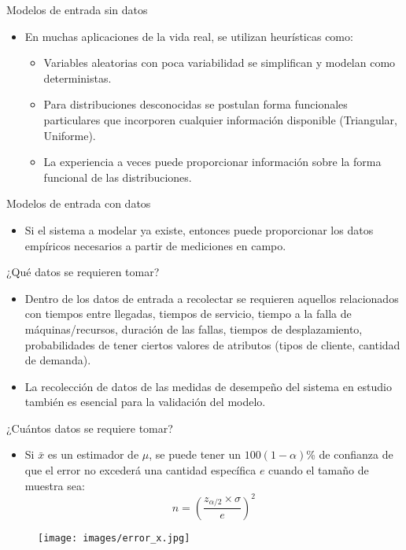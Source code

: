\begin{frame}{Modelos de entrada sin datos}
    \begin{itemize}
        \item En muchas aplicaciones de la vida real, se utilizan heurísticas como:
    \begin{itemize}
        \item Variables aleatorias con poca variabilidad se simplifican y modelan como deterministas.
        \item Para distribuciones desconocidas se postulan forma funcionales particulares que incorporen cualquier información disponible (Triangular, Uniforme). 
        \item La experiencia a veces puede proporcionar información sobre la forma funcional de las distribuciones.
    \end{itemize}
    \end{itemize}
\end{frame}

\begin{frame}{Modelos de entrada con datos}
    \begin{itemize}
    \item Si el sistema a modelar ya existe, entonces puede proporcionar los datos empíricos necesarios a partir de mediciones en campo.
    \end{itemize}
\end{frame}

\begin{frame}{¿Qué datos se requieren tomar?}
    \begin{itemize}
        \item Dentro de los datos de entrada a recolectar se requieren aquellos relacionados con tiempos entre llegadas, tiempos de servicio, tiempo a la falla de máquinas/recursos, duración de las fallas, tiempos de desplazamiento, probabilidades de tener ciertos valores de atributos (tipos de cliente, cantidad de demanda).
        \item La recolección de datos de las medidas de desempeño del sistema en estudio también es esencial para la validación del modelo.
    \end{itemize}
\end{frame}

\begin{frame}{¿Cuántos datos se requiere tomar?}
    \begin{itemize}
        \item Si $\bar{x}$ es un estimador de $\mu$, se puede tener un $100\left(1-\alpha\right)$\% de confianza de que el error no excederá una cantidad específica $e$ cuando el tamaño de muestra sea:
        \[n=\left(\dfrac{z_{\alpha/2}\times \sigma}{e}\right)^2\]
    \end{itemize}
    \begin{figure}
        \centering
        \texttt{[image: images/error\_x.jpg]}
    \end{figure}
\end{frame}

